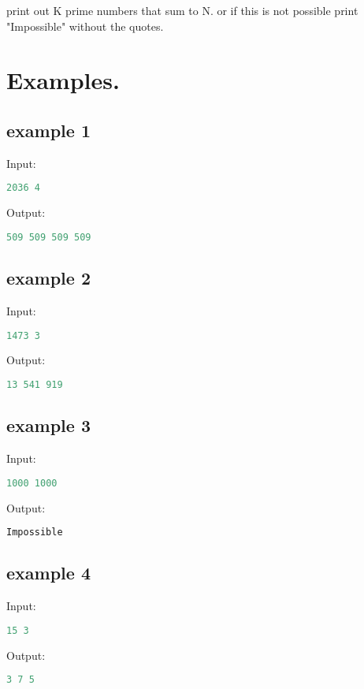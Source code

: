 \documentclass[10pt]{article}
\begin{document}
print out K prime numbers that sum to N. or if this is not possible print "Impossible" without the quotes.

\section{Examples.}
\subsection{example 1}
Input:
\begin{lstlisting}[language=Python]
2036 4
\end{lstlisting}
Output:
\begin{lstlisting}[language=Python]
509 509 509 509 
\end{lstlisting}
\subsection{example 2}
Input:
\begin{lstlisting}[language=Python]
1473 3
\end{lstlisting}
Output:
\begin{lstlisting}[language=Python]
13 541 919
\end{lstlisting}
\subsection{example 3}
Input:
\begin{lstlisting}[language=Python]
1000 1000
\end{lstlisting}
Output:
\begin{lstlisting}[language=Python]
Impossible
\end{lstlisting}
\subsection{example 4}
Input:
\begin{lstlisting}[language=Python]
15 3
\end{lstlisting}
Output:
\begin{lstlisting}[language=Python]
3 7 5
\end{lstlisting}
\end{document}
